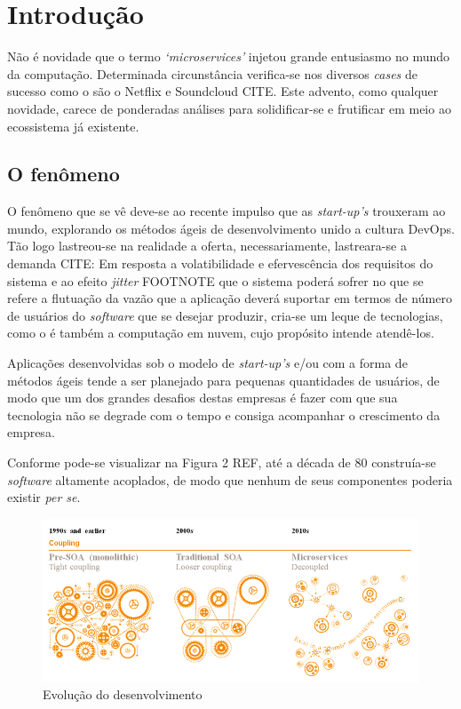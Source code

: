 \section{Introdução}

Não é novidade que o termo \textit{`microservices'} injetou grande entusiasmo no mundo da computação. Determinada circunstância verifica-se nos diversos \textit{cases} de sucesso como o são o Netflix e Soundcloud CITE. Este advento, como qualquer novidade, carece de ponderadas análises para solidificar-se e frutificar em meio ao ecossistema já existente.

\subsection{O fenômeno}

O fenômeno que se vê deve-se ao recente impulso que as \textit{start-up's} trouxeram ao mundo, explorando os métodos ágeis de desenvolvimento unido a cultura DevOps. Tão logo lastreou-se na realidade a oferta, necessariamente, lastreara-se a demanda CITE: Em resposta a volatibilidade e efervescência dos requisitos do sistema e ao efeito \textit{jitter} FOOTNOTE que o sistema poderá sofrer no que se refere a flutuação da vazão que a aplicação deverá suportar em termos de número de usuários do \textit{software} que se desejar produzir, cria-se um leque de tecnologias, como o é também a computação em nuvem, cujo propósito intende atendê-los.

Aplicações desenvolvidas sob o modelo de \textit{start-up's} e/ou com a forma de métodos ágeis tende a ser planejado para pequenas quantidades de usuários, de modo que um dos grandes desafios destas empresas é fazer com que sua tecnologia não se degrade com o tempo e consiga acompanhar o crescimento da empresa.

Conforme pode-se visualizar na Figura 2 REF, até a década de 80 construía-se \textit{software} altamente acoplados, de modo que nenhum de seus componentes poderia existir \textit{per se}.

\begin{figure}
\centering
\includegraphics[width=14cm]{feature02-figure02}
\caption{Evolução do desenvolvimento}
\end{figure}

